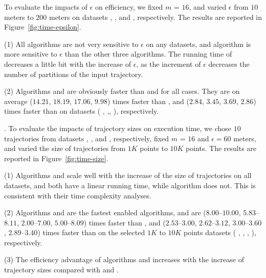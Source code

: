To evaluate the impacts of $\epsilon$ on efficiency, we fixed $m$ = $16$,
and varied $\epsilon$  from $10$ meters to $200$ meters on
{datasets}  \sercar, \geolife, \mopsi and \pricar, respectively.
The results are reported in Figure~\ref{fig:time-epsilon}.

\ni(1) All algorithms are not very sensitive to $\epsilon$ on any datasets, and algorithm \dps is more sensitive to $\epsilon$ than the other three algorithms.
The running time of \dps decreases a little bit with the increase of $\epsilon$, as the increment of $\epsilon$ decreases the number of partitions of the input trajectory.


\ni(2) Algorithms \cist and \cista are obviously faster than \dps and \squishe for all cases.
They are on average ($14.21$, $18.19$, $17.06$, $9.98$) times faster than \dps,
and ($2.84$, $3.45$, $3.69$, $2.86$) times faster than \squishe on
{datasets} ( \sercar, {\geolife},\mopsi, \pricar), respectively.


.
To evaluate the impacts of trajectory sizes on execution time,
we chose {$10$} trajectories from {datasets}  \sercar, \geolife, \mopsi and \pricar, respectively,
fixed $m$ = $16$ and $\epsilon = 60$ meters, and varied the size  of trajectories from $1K$ points to $10K$ points.
%
The results are reported in Figure~\ref{fig:time-size}.

\ni(1) Algorithms \cist and \cista scale well with the increase of the size of trajectories on all datasets,
and both have a linear running time, while algorithm \dps does not.
This is consistent with their time complexity analyses.

\ni(2) Algorithms \cist and \cista are the fastest \sed enabled \lsa algorithms,
and are {($8.00$--$10.00$, $5.83$--$8.11$, $2.00$--$7.00$, $5.00$--$8.09$) times faster than \dps,
and {($2.53$--$3.00$, $2.62$--$3.12$, $3.00$--$3.60$, $2.89$--$3.40$)}} times faster
than \squishe  on the selected $1K$ to $10K$ points datasets ( \sercar,
\geolife, \mopsi, \pricar), respectively.

\ni(3) The efficiency advantage of algorithms \cist and \cista increases with the increase of trajectory sizes compared with \dps and \squishe.



